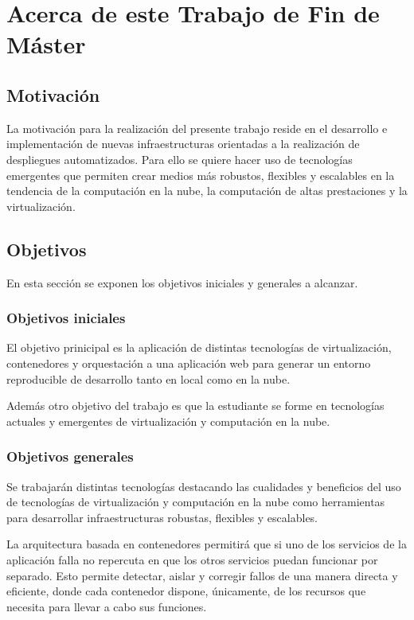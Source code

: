 \chapter{Acerca de este Trabajo de Fin de Máster}
\label{cha:introduction}

\section{Motivación}

La motivación para la realización del presente trabajo reside en el desarrollo e implementación de nuevas infraestructuras orientadas a la realización de despliegues automatizados. Para ello se quiere hacer uso de tecnologías emergentes que permiten crear medios más robustos, flexibles y escalables en la tendencia de la computación en la nube, la computación de altas prestaciones y la virtualización.

\section{Objetivos}

En esta sección se exponen los objetivos iniciales y generales a alcanzar.

\subsection{Objetivos iniciales}

El objetivo prinicipal es la aplicación de distintas tecnologías de virtualización, contenedores y orquestación a una aplicación web para generar un entorno reproducible de desarrollo tanto en local como en la nube.

Además otro objetivo del trabajo es que la estudiante se forme en tecnologías actuales y emergentes de virtualización y computación en la nube.

\subsection{Objetivos generales}

Se trabajarán distintas tecnologías destacando las cualidades y beneficios del uso de tecnologías de virtualización y computación en la nube como herramientas para desarrollar infraestructuras robustas, flexibles y escalables.

La arquitectura basada en contenedores permitirá que si uno de los servicios de la aplicación falla no repercuta en que los otros servicios puedan funcionar por separado. Esto permite detectar, aislar y corregir fallos de una manera directa y eficiente, donde cada contenedor dispone, únicamente, de los recursos que necesita para llevar a cabo sus funciones.

